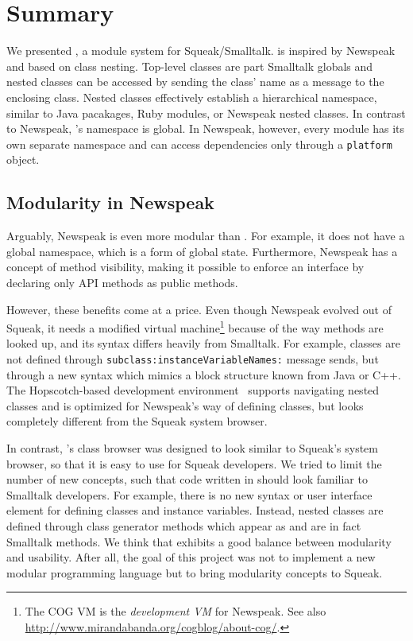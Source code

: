 \chapter{Summary}
\label{sec:summary}
We presented \msname, a module system for Squeak/Smalltalk. \msname is inspired by Newspeak and based on class nesting. Top-level classes are part Smalltalk globals and nested classes can be accessed by sending the class' name as a message to the enclosing class. Nested classes effectively establish a hierarchical namespace, similar to Java pacakages, Ruby modules, or Newspeak nested classes. In contrast to Newspeak, \msname's namespace is global. In Newspeak, however, every module has its own separate namespace and can access dependencies only through a \texttt{platform} object.

\section{Modularity in Newspeak}
Arguably, Newspeak is even more modular than \msname. For example, it does not have a global namespace, which is a form of global state. Furthermore, Newspeak has a concept of method visibility, making it possible to enforce an interface by declaring only API methods as public methods. 

However, these benefits come at a price. Even though Newspeak evolved out of Squeak, it needs a modified virtual machine\footnote{The COG VM is the \emph{development VM} for Newspeak. See also \url{http://www.mirandabanda.org/cogblog/about-cog/}.} because of the way methods are looked up, and its syntax differs heavily from Smalltalk. For example, classes are not defined through \texttt{subclass:instanceVariableNames:} message sends, but through a new syntax which mimics a block structure known from Java or C++. The Hopscotch-based development environment~\cite{Bykov08hopscotch:towards} supports navigating nested classes and is optimized for Newspeak's way of defining classes, but looks completely different from the Squeak system browser. 

In contrast, \msname's class browser was designed to look similar to Squeak's system browser, so that it is easy to use for Squeak developers. We tried to limit the number of new concepts, such that code written in \msname should look familiar to Smalltalk developers. For example, there is no new syntax or user interface element for defining classes and instance variables. Instead, nested classes are defined through class generator methods which appear as and are in fact Smalltalk methods. We think that \msname exhibits a good balance between modularity and usability. After all, the goal of this project was not to implement a new modular programming language but to bring modularity concepts to Squeak.

